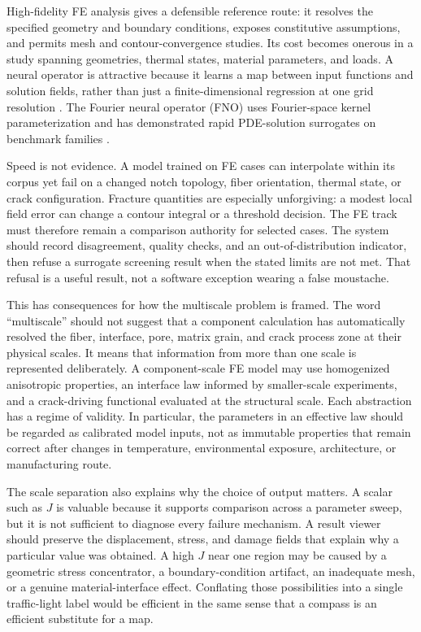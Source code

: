 \documentclass[11pt]{article}
\begin{document}
High-fidelity FE analysis gives a defensible reference route: it resolves the
specified geometry and boundary conditions, exposes constitutive assumptions,
and permits mesh and contour-convergence studies.  Its cost becomes onerous in a
study spanning geometries, thermal states, material parameters, and loads.  A
neural operator is attractive because it learns a map between input functions and
solution fields, rather than just a finite-dimensional regression at one grid
resolution \citep{kovachki2023}.  The Fourier neural operator (FNO) uses
Fourier-space kernel parameterization and has demonstrated rapid PDE-solution
surrogates on benchmark families \citep{li2021fno}.

Speed is not evidence.  A model trained on FE cases can interpolate within its
corpus yet fail on a changed notch topology, fiber orientation, thermal state, or
crack configuration.  Fracture quantities are especially unforgiving: a modest
local field error can change a contour integral or a threshold decision.  The FE
track must therefore remain a comparison authority for selected cases.  The
system should record disagreement, quality checks, and an out-of-distribution
indicator, then refuse a surrogate screening result when the stated limits are
not met.  That refusal is a useful result, not a software exception wearing a
false moustache.

This has consequences for how the multiscale problem is framed.  The word
``multiscale'' should not suggest that a component calculation has automatically
resolved the fiber, interface, pore, matrix grain, and crack process zone at
their physical scales.  It means that information from more than one scale is
represented deliberately.  A component-scale FE model may use homogenized
anisotropic properties, an interface law informed by smaller-scale experiments,
and a crack-driving functional evaluated at the structural scale.  Each
abstraction has a regime of validity.  In particular, the parameters in an
effective law should be regarded as calibrated model inputs, not as immutable
properties that remain correct after changes in temperature, environmental
exposure, architecture, or manufacturing route.

The scale separation also explains why the choice of output matters.  A scalar
such as $J$ is valuable because it supports comparison across a parameter sweep,
but it is not sufficient to diagnose every failure mechanism.  A result viewer
should preserve the displacement, stress, and damage fields that explain why a
particular value was obtained.  A high $J$ near one region may be caused by a
geometric stress concentrator, a boundary-condition artifact, an inadequate mesh,
or a genuine material-interface effect.  Conflating those possibilities into a
single traffic-light label would be efficient in the same sense that a compass is
an efficient substitute for a map.
\end{document}
